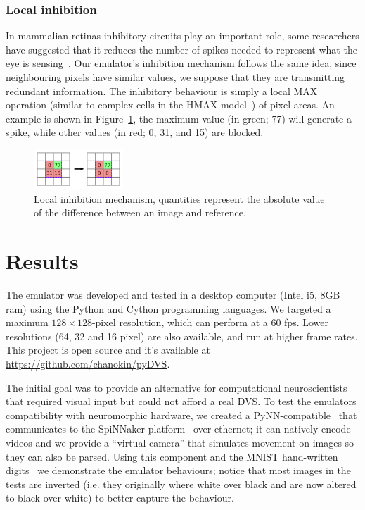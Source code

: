 \documentclass[twocolumn]{article}
\begin{document}
\subsubsection{Local inhibition} 
In mammalian retinas inhibitory circuits play an important role, some researchers have suggested that it reduces the number of spikes needed to represent what the eye is sensing~\cite{basab}. Our emulator's inhibition mechanism follows the same idea, since neighbouring pixels have similar values, we suppose that they are transmitting redundant information. The inhibitory behaviour is simply a local MAX operation (similar to complex cells in the HMAX model~\cite{riesenhuber1999hierarchical}) of pixel areas. An example is shown in Figure~\ref{fig:local_inh}, the maximum value (in green; 77) will generate a spike, while other values (in red; 0, 31, and 15) are blocked.

\begin{figure}[htb]
\centering
    \includegraphics[width=0.3\textwidth]{inh_local_max}
    \caption{Local inhibition mechanism, quantities represent the absolute value of the difference between an image and reference.}

  \label{fig:local_inh}
\end{figure}

\section{Results}

The emulator was developed and tested in a desktop computer (Intel i5, 8GB ram) using the Python and Cython programming languages. We targeted a maximum $128\times 128$-pixel resolution, which can perform at a 60 fps. Lower resolutions (64, 32 and 16 pixel) are also available, and run at higher frame rates. This project is open source and it's available at \url{https://github.com/chanokin/pyDVS}.

The initial goal was to provide an alternative for computational neuroscientists that required visual input but could not afford a real DVS. To test the emulators compatibility with neuromorphic hardware, we created a PyNN-compatible~\cite{pynn} that communicates to the SpiNNaker platform~\cite{spinnaker_overview} over ethernet; it can natively encode videos and we provide a ``virtual camera'' that simulates movement on images so they can also be parsed. Using this component and the MNIST hand-written digits~\cite{mnist} we demonstrate the emulator behaviours; notice that most images in the tests are inverted (i.e. they originally where white over black and are now altered to black over white) to better capture the behaviour.
\end{document}
